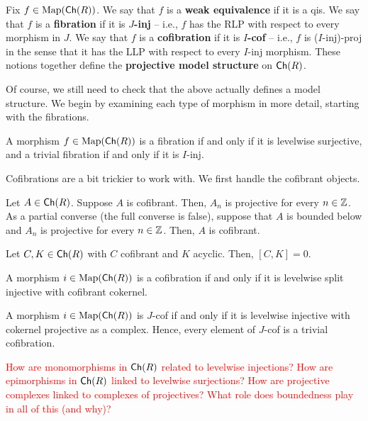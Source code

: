 \documentclass[11pt]{article}
\begin{document}
\begin{definition}
Fix $f\in\operatorname{Map}(\operatorname{\mathsf{Ch}}(R))$. We say that $f$ is a \textbf{weak equivalence} if it is a qis. We say that $f$ is a \textbf{fibration} if it is \textbf{$J$-inj} -- i.e., $f$ has the RLP with respect to every morphism in $J$. We say that $f$ is a \textbf{cofibration} if it is \textbf{$I$-cof} -- i.e., $f$ is ($I$-inj)-proj in the sense that it has the LLP with respect to every $I$-inj morphism. These notions together define the \textbf{projective model structure} on $\operatorname{\mathsf{Ch}}(R)$.
\end{definition}

Of course, we still need to check that the above actually defines a model structure. We begin by examining each type of morphism in more detail, starting with the fibrations.

\begin{proposition}
A morphism $f\in\operatorname{Map}(\operatorname{\mathsf{Ch}}(R))$ is a fibration if and only if it is levelwise surjective, and a trivial fibration if and only if it is $I$-inj.
\end{proposition}

Cofibrations are a bit trickier to work with. We first handle the cofibrant objects.

\begin{proposition}
Let $A\in\operatorname{\mathsf{Ch}}(R)$. Suppose $A$ is cofibrant. Then, $A_n$ is projective for every $n\in\mathbb{Z}$. As a partial converse (the full converse is false), suppose that $A$ is bounded below and $A_n$ is projective for every $n\in\mathbb{Z}$. Then, $A$ is cofibrant.
\end{proposition}

\begin{lemma}
Let $C,K\in\operatorname{\mathsf{Ch}}(R)$ with $C$ cofibrant and $K$ acyclic. Then, $[C,K]=0$.
\end{lemma}

\begin{proposition}
A morphism $i\in\operatorname{Map}(\operatorname{\mathsf{Ch}}(R))$ is a cofibration if and only if it is levelwise split injective with cofibrant cokernel.
\end{proposition}

\begin{proposition}
A morphism $i\in\operatorname{Map}(\operatorname{\mathsf{Ch}}(R))$ is $J$-cof if and only if it is levelwise injective with cokernel projective as a complex. Hence, every element of $J$-cof is a trivial cofibration.
\end{proposition}

\textcolor{red}{How are monomorphisms in $\operatorname{\mathsf{Ch}}(R)$ related to levelwise injections? How are epimorphisms in $\operatorname{\mathsf{Ch}}(R)$ linked to levelwise surjections? How are projective complexes linked to complexes of projectives? What role does boundedness play in all of this (and why)?}
\end{document}
